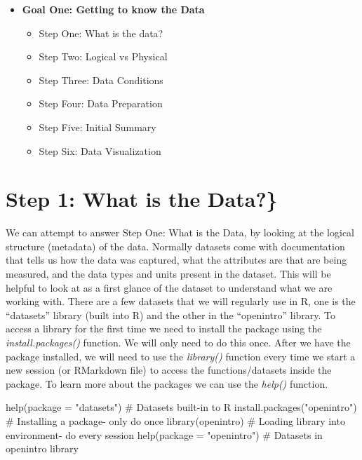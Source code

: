 \documentclass[
  letterpaper,
  DIV=11,
  numbers=noendperiod]{scrreprt}
\newenvironment{Shaded}{\begin{snugshade}}{\end{snugshade}}
\newcommand{\AttributeTok}[1]{\textcolor[rgb]{0.40,0.45,0.13}{#1}}
\newcommand{\CommentTok}[1]{\textcolor[rgb]{0.37,0.37,0.37}{#1}}
\newcommand{\FunctionTok}[1]{\textcolor[rgb]{0.28,0.35,0.67}{#1}}
\newcommand{\NormalTok}[1]{\textcolor[rgb]{0.00,0.23,0.31}{#1}}
\newcommand{\StringTok}[1]{\textcolor[rgb]{0.13,0.47,0.30}{#1}}
\providecommand{\tightlist}{%
  \setlength{\itemsep}{0pt}\setlength{\parskip}{0pt}}
\begin{document}
\begin{itemize}
\tightlist
\item
  \textbf{Goal One: Getting to know the Data}

  \begin{itemize}
  \tightlist
  \item
    Step One: What is the data?
  \item
    Step Two: Logical vs Physical
  \item
    Step Three: Data Conditions
  \item
    Step Four: Data Preparation
  \item
    Step Five: Initial Summary
  \item
    Step Six: Data Visualization
  \end{itemize}
\end{itemize}

\section{Step 1: What is the Data?\}}\label{step-1-what-is-the-data}

We can attempt to answer Step One: What is the Data, by looking at the
logical structure (metadata) of the data. Normally datasets come with
documentation that tells us how the data was captured, what the
attributes are that are being measured, and the data types and units
present in the dataset. This will be helpful to look at as a first
glance of the dataset to understand what we are working with. There are
a few datasets that we will regularly use in R, one is the ``datasets''
library (built into R) and the other in the ``openintro'' library. To
access a library for the first time we need to install the package using
the \emph{install.packages()} function. We will only need to do this
once. After we have the package installed, we will need to use the
\emph{library()} function every time we start a new session (or
RMarkdown file) to access the functions/datasets inside the package. To
learn more about the packages we can use the \emph{help()} function.

\begin{Shaded}
\begin{Highlighting}[]
\FunctionTok{help}\NormalTok{(}\AttributeTok{package =} \StringTok{"datasets"}\NormalTok{) }\CommentTok{\# Datasets built{-}in to R}
\FunctionTok{install.packages}\NormalTok{(}\StringTok{"openintro"}\NormalTok{) }\CommentTok{\# Installing a package{-} only do once}
\FunctionTok{library}\NormalTok{(openintro) }\CommentTok{\# Loading library into environment{-} do every session}
\FunctionTok{help}\NormalTok{(}\AttributeTok{package =} \StringTok{"openintro"}\NormalTok{) }\CommentTok{\# Datasets in openintro library}
\end{Highlighting}
\end{Shaded}
\end{document}
